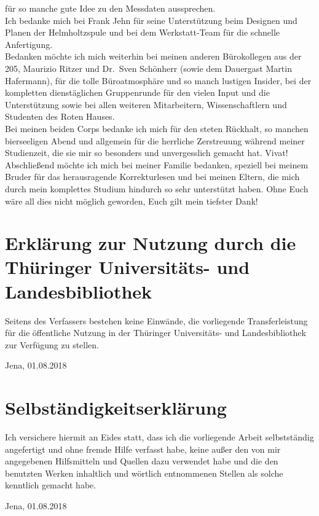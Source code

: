 für so manche gute Idee zu den Messdaten aussprechen.\\ Ich bedanke mich bei
Frank Jehn für seine Unterstützung beim Designen und Planen der Helmholtzspule
und bei dem Werkstatt-Team für die schnelle Anfertigung.\\ Bedanken möchte ich
mich weiterhin bei meinen anderen Bürokollegen aus der 205, Maurizio Ritzer und
Dr.\ Sven Schönherr (sowie dem Dauergast Martin Hafermann), für die tolle
Büroatmosphäre und so manch lustigen Insider, bei der kompletten dienstäglichen
Gruppenrunde für den vielen Input und die Unterstützung sowie bei allen weiteren
Mitarbeitern, Wissenschaftlern und Studenten des Roten Hauses.\\ Bei meinen
beiden Corps bedanke ich mich für den steten Rückhalt, so manchen bierseeligen
Abend und allgemein für die herrliche Zerstreuung während meiner Studienzeit,
die sie mir so besonders und unvergesslich gemacht hat. Vivat! \\ Abschließend
möchte ich mich bei meiner Familie bedanken, speziell bei meinem Bruder für das
herausragende Korrekturlesen und bei meinen Eltern, die mich durch mein
komplettes Studium hindurch so sehr unterstützt haben. Ohne Euch wäre all dies
nicht möglich geworden, Euch gilt mein tiefster Dank! \newpage
\thispagestyle{empty} \section*{Erklärung zur Nutzung durch die Thüringer
Universitäts- und Landesbibliothek} Seitens des Verfassers bestehen keine
Einwände, die vorliegende Transferleistung für die öffentliche Nutzung in der
Thüringer Universitäts- und Landesbibliothek zur Verfügung zu stellen.
\vspace*{2cm}

\begin{flushright} Jena, 01.08.2018 \end{flushright} \vspace*{2cm}
\section*{Selbständigkeitserklärung} Ich versichere hiermit an Eides statt, dass
ich die vorliegende Arbeit selbstständig angefertigt und ohne fremde Hilfe
verfasst habe, keine außer den von mir angegebenen Hilfsmitteln und Quellen dazu
verwendet habe und die den benutzten Werken inhaltlich und wörtlich entnommenen
Stellen als solche kenntlich gemacht habe. \vspace*{2cm}

\begin{flushright} Jena, 01.08.2018 \end{flushright}
